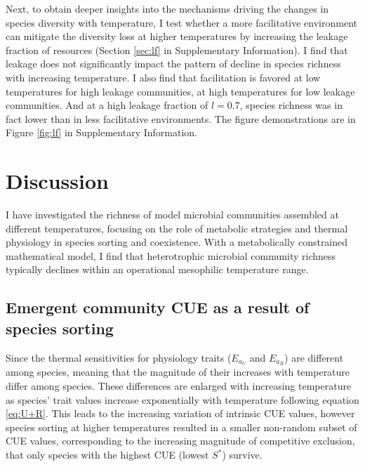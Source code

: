 \documentclass[11pt, a4paper]{article}
\begin{document}
\begin{spacing}{1.5}
Next, to obtain deeper insights into the mechanisms driving the changes in species diversity with temperature, I test whether a more facilitative environment can mitigate the diversity loss at higher temperatures by increasing the leakage fraction of resources (Section \ref{sec:lf} in Supplementary Information). I find that leakage does not significantly impact the pattern of decline in species richness with increasing temperature. I also find that facilitation is favored at low temperatures for high leakage communities, at high temperatures for low leakage communities. And at a high leakage fraction of $l=0.7$, species richness was in fact lower than in less facilitative environments. The figure demonstrations are in Figure \ref{fig:lf} in Supplementary Information. 

\section{Discussion}

I have investigated the richness of model microbial communities assembled at different temperatures, focusing on the role of metabolic strategies and thermal physiology in species sorting and coexistence. With a metabolically constrained mathematical model, I find that heterotrophic microbial community richness typically declines within an operational mesophilic temperature range. 

\subsection{Emergent community CUE as a result of species sorting}

Since the thermal sensitivities for physiology traits ($E_{a_U}$ and $E_{a_R}$) are different among species, meaning that the magnitude of their increases with temperature differ among species. These differences are enlarged with increasing temperature as species' trait values increase exponentially with temperature following equation \ref{eq:U+R}. This leads to the increasing variation of intrinsic CUE values, however species sorting at higher temperatures resulted in a smaller non-random subset of CUE values, corresponding to the increasing magnitude of competitive exclusion, that only species with the highest CUE (lowest $S^*$) survive. 


\end{spacing}
\end{document}
